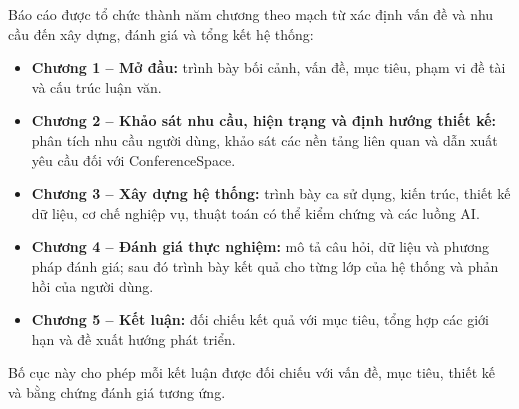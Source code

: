 Báo cáo được tổ chức thành năm chương theo mạch từ xác định vấn đề và nhu cầu đến xây dựng, đánh giá và tổng kết hệ thống:

\begin{itemize}
\item \textbf{Chương 1 -- Mở đầu:} trình bày bối cảnh, vấn đề, mục tiêu, phạm vi đề tài và cấu trúc luận văn.
\item \textbf{Chương 2 -- Khảo sát nhu cầu, hiện trạng và định hướng thiết kế:} phân tích nhu cầu người dùng, khảo sát các nền tảng liên quan và dẫn xuất yêu cầu đối với ConferenceSpace.
\item \textbf{Chương 3 -- Xây dựng hệ thống:} trình bày ca sử dụng, kiến trúc, thiết kế dữ liệu, cơ chế nghiệp vụ, thuật toán có thể kiểm chứng và các luồng AI.
\item \textbf{Chương 4 -- Đánh giá thực nghiệm:} mô tả câu hỏi, dữ liệu và phương pháp đánh giá; sau đó trình bày kết quả cho từng lớp của hệ thống và phản hồi của người dùng.
\item \textbf{Chương 5 -- Kết luận:} đối chiếu kết quả với mục tiêu, tổng hợp các giới hạn và đề xuất hướng phát triển.
\end{itemize}

Bố cục này cho phép mỗi kết luận được đối chiếu với vấn đề, mục tiêu, thiết kế và bằng chứng đánh giá tương ứng.
